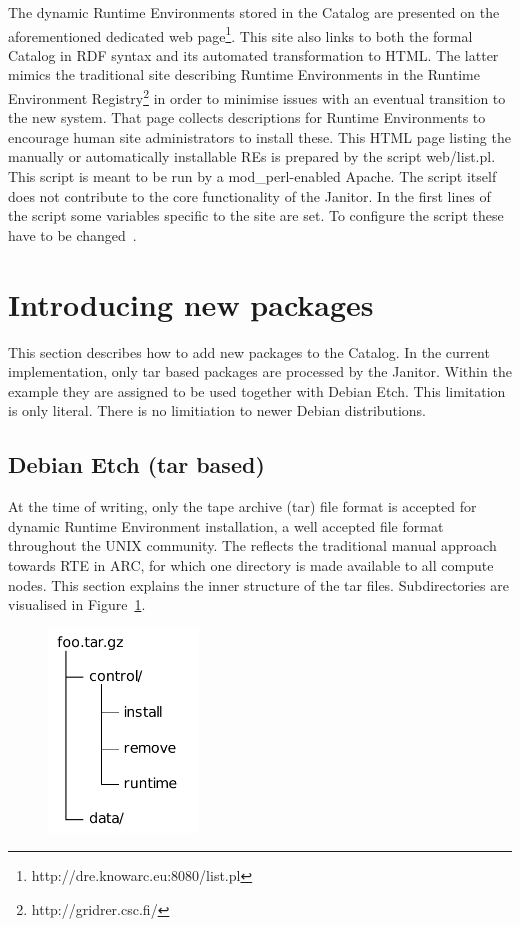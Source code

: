 The dynamic Runtime Environments stored in the Catalog are presented on the aforementioned dedicated web
page\footnote{http://dre.knowarc.eu:8080/list.pl}. This site also links to both the formal Catalog in 
RDF syntax and its automated transformation to
HTML. The latter mimics the traditional site describing Runtime Environments in the Runtime Environment
Registry\footnote{http://gridrer.csc.fi/} in order to minimise issues with an eventual transition to the new system. 
That page collects descriptions for Runtime Environments to encourage human site administrators to install these.
This HTML page listing the manually or automatically installable REs is prepared by the script web/list.pl.
This script is meant to be run by a mod\_perl-enabled Apache. The script itself does not contribute to the 
core functionality of the Janitor.
In the first lines of the script some variables specific to the site are set. To configure the
script these have to be changed~\cite[p. 9]{BAYER_2007}.



\section{Introducing new packages}\label{sec:catalog}

This section describes how to add new packages to the Catalog. In the current implementation, only tar based packages are processed by the Janitor.
Within the example they are assigned to be used together with Debian Etch. This limitation is only literal. 
There is no limitiation to newer Debian distributions.

\subsection{Debian Etch (tar based)}

At the time of writing, only the tape archive (tar) file format is accepted for dynamic Runtime Environment installation, 
a well accepted file format throughout the UNIX community. The reflects the traditional manual approach towards RTE in ARC,
for which one directory is made available to all compute nodes. This section explains the inner structure of the tar files. 
Subdirectories are visualised in Figure~\ref{fig:tar_folder}.

\begin{figure}
  \begin{center}
    \includegraphics[width=4cm]{images/tar_folder.pdf}
    \label{fig:tar_folder}
  \end{center}
\end{figure}

